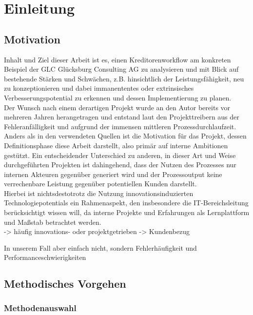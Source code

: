 \chapter{Einleitung}

\section{Motivation}

Inhalt und Ziel dieser Arbeit ist es, einen Kreditorenworkflow am konkreten Beispiel der GLC Glücksburg Consulting AG zu analysieren und mit Blick auf bestehende Stärken und Schwächen, z.B. hinsichtlich der Leistungsfähigkeit, neu zu konzeptionieren und dabei immanententes oder extrinsisches Verbesserungspotential zu erkennen und dessen Implementierung zu planen.\\
Der Wunsch nach einem derartigen Projekt wurde an den Autor bereits vor mehreren Jahren herangetragen und entstand laut den Projekttreibern aus der Fehleranfälligkeit und aufgrund der immensen mittleren Prozessdurchlaufzeit. \\
Anders als in den verwendeten Quellen ist die Motivation für das Projekt, dessen Definitionsphase diese Arbeit darstellt, also primär auf interne Ambitionen gestützt.
Ein entscheidender Unterschied zu anderen, in dieser Art und Weise durchgeführten Projekten ist dahingehend, dass der Nutzen des Prozesses nur internen Akteuren gegenüber generiert wird und der Prozessoutput keine verrechenbare Leistung gegenüber potentiellen Kunden darstellt.\\
Hierbei ist nichtsdestotrotz die Nutzung innovationsinduzierten Technologiepotentials ein Rahmenaspekt, den insbesondere die IT-Bereichsleitung berücksichtigt wissen will, da interne Projekte und Erfahrungen als Lernplattform und Maßstab betrachtet werden. \\


-> häufig innovations- oder projektgetrieben
-> Kundenbezug

In unserem Fall aber einfach nicht, sondern Fehlerhäufigkeit und Performanceschwierigkeiten

\section{Methodisches Vorgehen}
\subsection{Methodenauswahl}

